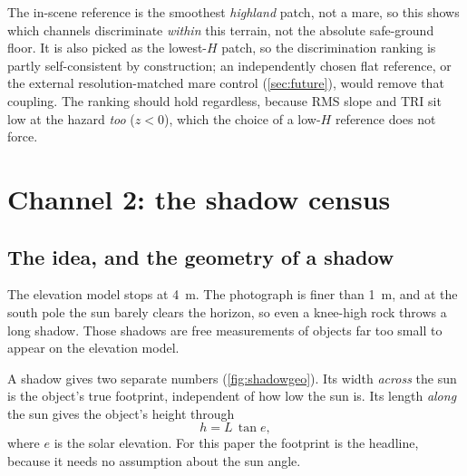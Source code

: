 \documentclass[11pt]{article}
\begin{document}
\begin{limitbox}
The in-scene reference is the smoothest \emph{highland} patch, not a mare, so this
shows which channels discriminate \emph{within} this terrain, not the absolute
safe-ground floor. It is also picked as the lowest-$H$ patch, so the discrimination
ranking is partly self-consistent by construction; an independently chosen flat
reference, or the external resolution-matched mare control (\cref{sec:future}), would
remove that coupling. The ranking should hold regardless, because RMS slope and TRI
sit low at the hazard \emph{too} ($z<0$), which the choice of a low-$H$ reference does
not force.
\end{limitbox}

\section{Channel 2: the shadow census}

\subsection{The idea, and the geometry of a shadow}
\begin{plainbox}
The elevation model stops at \SI{4}{\meter}. The photograph is finer than
\SI{1}{\meter}, and at the south pole the sun barely clears the horizon, so even a
knee-high rock throws a long shadow. Those shadows are free measurements of objects
far too small to appear on the elevation model.
\end{plainbox}

A shadow gives two separate numbers (\cref{fig:shadowgeo}). Its width \emph{across}
the sun is the object's true footprint, independent of how low the sun is. Its length
\emph{along} the sun gives the object's height through
\begin{equation}
h = L\,\tan e,
\label{eq:relief}
\end{equation}
where $e$ is the solar elevation. For this paper the footprint is the headline,
because it needs no assumption about the sun angle.
\end{document}
